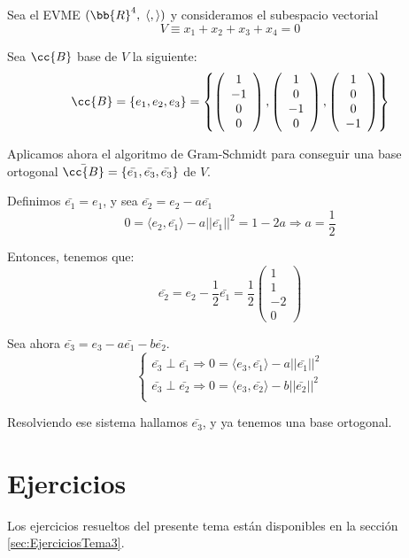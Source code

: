 \begin{ejemplo}
    Sea el EVME $(\bb{R}^4,\;\langle,\rangle)$ y consideramos el subespacio vectorial $$V\equiv x_1+x_2+x_3+x_4=0$$

    Sea $\cc{B}$ base de $V$ la siguiente:
    \begin{equation*}
        \cc{B}=\{e_1, e_2, e_3\} = \left\{
        \left(\begin{array}{c}
            1 \\ -1 \\ 0 \\ 0
        \end{array}\right),
        \left(\begin{array}{c}
            1 \\ 0 \\ -1 \\ 0
        \end{array}\right),
        \left(\begin{array}{c}
            1 \\ 0 \\ 0 \\ -1
        \end{array}\right)
        \right\}
    \end{equation*}

    Aplicamos ahora el algoritmo de Gram-Schmidt para conseguir una base ortogonal $\bar{\cc{B}} = \{\bar{e_1}, \bar{e_3}, \bar{e_3}\}$ de $V$.

    Definimos $\bar{e_1} = e_1$, y sea $\bar{e_2} = e_2-a\bar{e_1}$
    \begin{equation*}
        0 = \langle e_2, \bar{e_1}\rangle -a||\bar{e_1}||^2 = 1-2a \Longrightarrow a=\frac{1}{2}
    \end{equation*}

    Entonces, tenemos que:
    \begin{equation*}
        \bar{e_2} = e_2 -\frac{1}{2}\bar{e_1} = \frac{1}{2}\left(\begin{array}{c}
            1 \\ 1 \\ -2 \\ 0
        \end{array}\right)
    \end{equation*}

    Sea ahora $\bar{e_3} = e_3 -a\bar{e_1} -b\bar{e_2}$.
    \begin{equation*}
        \left\{\begin{array}{l}
            \bar{e_3}\perp \bar{e_1} \Longrightarrow 0=\langle e_3, \bar{e_1}\rangle - a||\bar{e_1}||^2  \\
            \bar{e_3}\perp \bar{e_2} \Longrightarrow 0=\langle e_3, \bar{e_2}\rangle - b||\bar{e_2}||^2  \\
        \end{array}\right.
    \end{equation*}

    Resolviendo ese sistema hallamos $\bar{e_3}$, y ya tenemos una base ortogonal.
\end{ejemplo}


\section{Ejercicios}
Los ejercicios resueltos del presente tema están disponibles en la sección \ref{sec:EjerciciosTema3}.